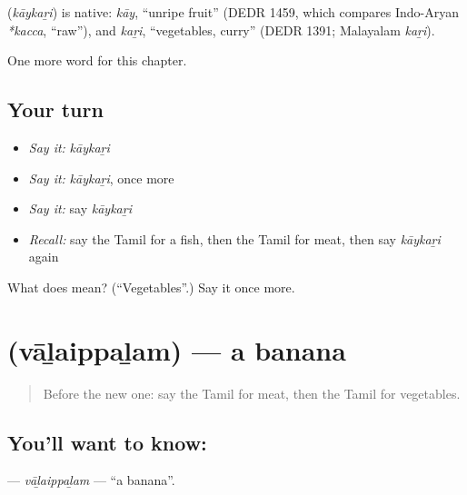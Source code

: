 \begin{cousinweb}
\textbf{} (\emph{kāykaṟi}) is native: \emph{kāy}, \textquotedblleft{}unripe fruit\textquotedblright{} (DEDR 1459, which compares Indo-Aryan \emph{*kacca}, \textquotedblleft{}raw\textquotedblright{}), and \emph{kaṟi}, \textquotedblleft{}vegetables, curry\textquotedblright{} (DEDR 1391; Malayalam \emph{kaṟi}).
\end{cousinweb}

\begin{grammarlens}[title={What you've built}]
One more word for this chapter.
\end{grammarlens}

\subsection*{Your turn}
\begin{itemize}
\raggedright
  \item \emph{Say it:} \emph{kāykaṟi}
  \item \emph{Say it:} \emph{kāykaṟi}, once more
  \item \emph{Say it:} say \emph{kāykaṟi}
  \item \emph{Recall:} say the Tamil for a fish, then the Tamil for meat, then say \emph{kāykaṟi} again
\end{itemize}

\begin{tcolorbox}[breakable,colback=teal!4,colframe=teal!35!black,title={Before you move on}]
What does  mean? (\textquotedblleft{}Vegetables\textquotedblright{}.) Say it once more.
\end{tcolorbox}
\section[\texorpdfstring{\ta{வாழைப்பழம்} (vāḻaippaḻam)}{வாழைப்பழம் (vāḻaippaḻam)}]{ (vāḻaippaḻam) — a banana}

\label{lesson:TA-C123-valaippalam}



\begin{quote}
Before the new one: say the Tamil for meat, then the Tamil for vegetables.
\end{quote}

\subsection*{You'll want to know: }
\textbf{} — \emph{vāḻaippaḻam} — \textquotedblleft{}a banana\textquotedblright{}.

